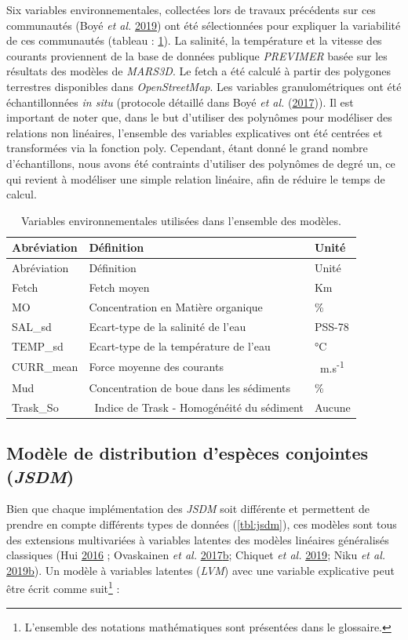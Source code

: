 \documentclass[12pt,]{article}
\begin{document}
Six variables environnementales, collectées lors de travaux précédents
sur ces communautés (Boyé \emph{et al.}
\protect\hyperlink{ref-Boye_2019a}{2019}) ont été sélectionnées pour
expliquer la variabilité de ces communautés (tableau : \ref{tbl:env}).
La salinité, la température et la vitesse des courants proviennent de la
base de données publique \emph{PREVIMER} basée sur les résultats des
modèles de \emph{MARS3D}. Le fetch a été calculé à partir des polygones
terrestres disponibles dans \emph{OpenStreetMap}. Les variables
granulométriques ont été échantillonnées \emph{in situ} (protocole
détaillé dans Boyé \emph{et al.}
(\protect\hyperlink{ref-Boye_2017}{2017})). Il est important de noter
que, dans le but d'utiliser des polynômes pour modéliser des relations
non linéaires, l'ensemble des variables explicatives ont été centrées et
transformées via la fonction poly. Cependant, étant donné le grand
nombre d'échantillons, nous avons été contraints d'utiliser des
polynômes de degré un, ce qui revient à modéliser une simple relation
linéaire, afin de réduire le temps de calcul.

{\small
\begin{longtable}[]{@{}lll@{}}
\caption{Variables environnementales utilisées dans l'ensemble des
modèles. \label{tbl:env}}\tabularnewline
\toprule
Abréviation & Définition & Unité\tabularnewline
\midrule
\endfirsthead
\toprule
Abréviation & Définition & Unité\tabularnewline
\midrule
\endhead
Fetch & Fetch moyen & Km\tabularnewline
MO & Concentration en Matière organique & \%\tabularnewline
SAL\_sd & Ecart-type de la salinité de l'eau & PSS-78\tabularnewline
TEMP\_sd & Ecart-type de la température de l'eau & °C~\tabularnewline
CURR\_mean & Force moyenne des courants &
~m.s\textsuperscript{-1}\tabularnewline
Mud & Concentration de boue dans les sédiments & \%\tabularnewline
Trask\_So & ~Indice de Trask - Homogénéité du sédiment &
Aucune\tabularnewline
\bottomrule
\end{longtable}}\FloatBarrier


\hypertarget{moduxe8le-de-distribution-despuxe8ces-conjointes-jsdm}{%
\subsection{\texorpdfstring{Modèle de distribution d'espèces conjointes
(\emph{JSDM})}{Modèle de distribution d'espèces conjointes (JSDM)}}\label{moduxe8le-de-distribution-despuxe8ces-conjointes-jsdm}}

Bien que chaque implémentation des \emph{JSDM} soit différente et
permettent de prendre en compte différents types de données
(\cref{tbl:jsdm}), ces modèles sont tous des extensions multivariées à
variables latentes des modèles linéaires généralisés classiques (Hui
\protect\hyperlink{ref-Hui_2016}{2016} ; Ovaskainen \emph{et al.}
\protect\hyperlink{ref-Ovaskainen_2017a}{2017}\protect\hyperlink{ref-Ovaskainen_2017a}{b};
Chiquet \emph{et al.} \protect\hyperlink{ref-Chiquet_2019}{2019}; Niku
\emph{et al.}
\protect\hyperlink{ref-Niku_2019}{2019}\protect\hyperlink{ref-Niku_2019}{b}).
Un modèle à variables latentes (\emph{LVM}) avec une variable
explicative peut être écrit comme suit\footnote{L'ensemble des notations
  mathématiques sont présentées dans le glossaire.} :
\end{document}
